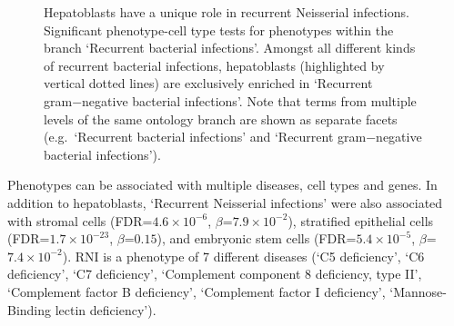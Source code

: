 \documentclass[
]{report}
\begin{document}
\begin{figure}[H]


\caption{\label{fig-rniD08295A6-16DC-499D-85A8-8BA656E013A2}Hepatoblasts
have a unique role in recurrent Neisserial infections. Significant
phenotype-cell type tests for phenotypes within the branch `Recurrent
bacterial infections'. Amongst all different kinds of recurrent
bacterial infections, hepatoblasts (highlighted by vertical dotted
lines) are exclusively enriched in `Recurrent gram−negative bacterial
infections'. Note that terms from multiple levels of the same ontology
branch are shown as separate facets (e.g.~`Recurrent bacterial
infections' and `Recurrent gram−negative bacterial infections').}

\end{figure}%

Phenotypes can be associated with multiple diseases, cell types and
genes. In addition to hepatoblasts, `Recurrent Neisserial infections'
were also associated with stromal cells (FDR=\(4.6 \times 10^{-6}\),
\(\beta\)=\(7.9 \times 10^{-2}\)), stratified epithelial cells
(FDR=\(1.7 \times 10^{-23}\), \(\beta\)=\(0.15\)), and embryonic stem
cells (FDR=\(5.4 \times 10^{-5}\), \(\beta\)=\(7.4 \times 10^{-2}\)).
RNI is a phenotype of 7 different diseases (`C5 deficiency', `C6
deficiency', `C7 deficiency', `Complement component 8 deficiency, type
II', `Complement factor B deficiency', `Complement factor I deficiency',
`Mannose-Binding lectin deficiency').
\end{document}
